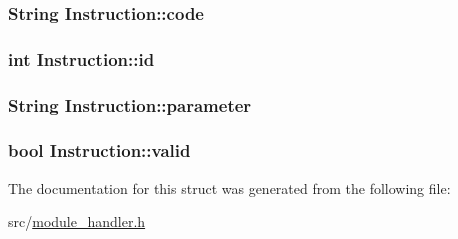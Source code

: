 \subsubsection[{code}]{\setlength{\rightskip}{0pt plus 5cm}String Instruction\+::code}\label{struct_instruction_ad888a5bd187437c04dca0f5574ce4ebd}
\hypertarget{struct_instruction_aca74587d9d1a44daca3b0965af207a4c}{}
\subsubsection[{id}]{\setlength{\rightskip}{0pt plus 5cm}int Instruction\+::id}\label{struct_instruction_aca74587d9d1a44daca3b0965af207a4c}
\hypertarget{struct_instruction_a61c139a5e35c88092611020e999e220d}{}
\subsubsection[{parameter}]{\setlength{\rightskip}{0pt plus 5cm}String Instruction\+::parameter}\label{struct_instruction_a61c139a5e35c88092611020e999e220d}
\hypertarget{struct_instruction_a3951b82b53920c98582baa6be7210180}{}
\subsubsection[{valid}]{\setlength{\rightskip}{0pt plus 5cm}bool Instruction\+::valid}\label{struct_instruction_a3951b82b53920c98582baa6be7210180}


The documentation for this struct was generated from the following file\+:\begin{DoxyCompactItemize}
\item 
src/\hyperlink{module__handler_8h}{module\+\_\+handler.\+h}\end{DoxyCompactItemize}
